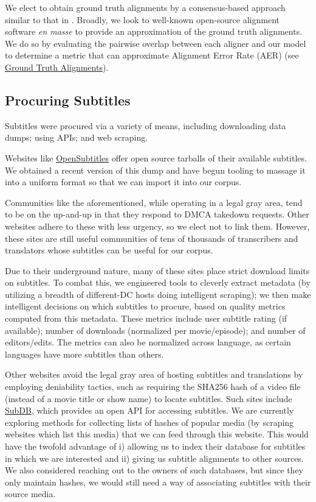 \documentclass[twoside,twocolumn]{article}
\begin{document}
We elect to obtain ground truth alignments by a consensus-based
approach similar to that in \cite{liu2015streaming}. Broadly, we look to
well-known open-source alignment software \textit{en masse} to provide an
approximation of the ground truth alignments. We do so by evaluating the
pairwise overlap between each aligner and our model to determine a metric that
can approximate
Alignment Error Rate (AER) (see
\hyperref[subsec:ground-truth-alignments]{Ground Truth Alignments}).

\subsection{Procuring Subtitles}
\label{subsec:procuring-subtitles}

Subtitles were procured via a variety of means, including downloading data
dumps; using APIs; and web scraping.

Websites like \href{https://www.opensubtitles.org/}{OpenSubtitles} offer
open source tarballs of their available subtitles. We obtained
a recent version of this dump and have begun tooling to massage it into a
uniform format so that we can import it into our corpus.

Communities like the aforementioned, while operating in a legal gray area, tend
to be on the up-and-up in that they respond to DMCA takedown requests. Other
websites adhere to these with less urgency, so we elect not to link them.
However, these sites are still useful communities of tens of thousands of
transcribers and translators whose subtitles can be useful for our corpus.

Due to their underground nature, many of these sites place strict download
limits on subtitles. To combat this, we engineered tools to cleverly extract
metadata (by utilizing a breadth of different-DC hosts doing intelligent
scraping); we then make intelligent decisions on which subtitles to procure,
based on quality metrics computed from this metadata. These metrics include
user subtitle rating (if available); number of downloads (normalized per
movie/episode); and number of editors/edits. The metrics can also be normalized
across language, as certain languages have more subtitles than others.

Other websites avoid the legal gray area of hosting subtitles and translations
by employing deniability tactics, such as requiring the SHA256 hash of a video
file (instead of a movie title or show name) to locate subtitles. Such sites
include \href{http://thesubdb.com/}{SubDB}, which provides an open API for
accessing subtitles. We are currently exploring methods for collecting lists of
hashes of popular media (by scraping websites which list this media) that we
can feed through this website. This would have the twofold advantage of
i) allowing us to index their database for subtitles in which we are interested
and ii) giving us subtitle alignments to other sources. We also considered
reaching out to the owners of such databases, but since they only maintain
hashes, we would still need a way of associating subtitles with their source
media.
\end{document}
